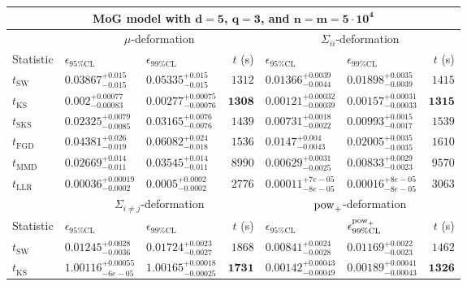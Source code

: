 \begin{tabular}{l|llr|llr}
	\toprule
	\multicolumn{7}{c}{{\bf MoG model with $\mathbf{d=5}$, $\mathbf{q=3}$, and $\mathbf{n=m=5\cdot 10^{4}}$}} \\
	\toprule
	\multicolumn{1}{c}{} & \multicolumn{3}{c}{$\mu$-deformation} & \multicolumn{3}{c}{$\Sigma_{ii}$-deformation} \\
	Statistic & $\epsilon_{95\%\mathrm{CL}}$ & $\epsilon_{99\%\mathrm    {CL}}$ & $t$ (s) & $\epsilon_{95\%\mathrm{CL}}$ & $\epsilon_{99\%\mathrm{CL}}$ & $t$ (s) \\
	\midrule
	$t_{\mathrm{SW}}$ & $0.03867_{-0.015}^{+0.015}$ & $0.05335_{-0.015}^{+0.015}$ & $1312$ & $0.01366_{-0.0044}^{+0.0039}$ & $0.01898_{-0.0039}^{+0.0035}$ & $1415$ \\
	$t_{\overline{\mathrm{KS}}}$ & ${\mathbf{0.002_{-0.00083}^{+0.00077}}}$ & ${\mathbf{0.00277_{-0.00076}^{+0.00075}}}$ & ${\mathbf{1308}}$ & ${\mathbf{0.00121_{-0.00039}^{+0.00032}}}$ & ${\mathbf{0.00157_{-0.00033}^{+0.00031}}}$ & ${\mathbf{1315}}$ \\
	$t_{\mathrm{SKS}}$ & $0.02325_{-0.0085}^{+0.0079}$ & $0.03165_{-0.0076}^{+0.0076}$ & $1439$ & $0.00731_{-0.0022}^{+0.0018}$ & $0.00993_{-0.0017}^{+0.0015}$ & $1539$ \\
	$t_{\mathrm{FGD}}$ & $0.04381_{-0.019}^{+0.026}$ & $0.06082_{-0.018}^{+0.024}$ & $1536$ & $0.0147_{-0.0043}^{+0.004}$ & $0.02005_{-0.0035}^{+0.0035}$ & $1610$ \\
	$t_{\mathrm{MMD}}$ & $0.02669_{-0.011}^{+0.014}$ & $0.03545_{-0.011}^{+0.014}$ & $8990$ & $0.00629_{-0.0025}^{+0.0031}$ & $0.00833_{-0.0023}^{+0.0029}$ & $9570$ \\
	$t_{\mathrm{LLR}}$ & $0.00036_{-0.0002}^{+0.00019}$ & $0.0005_{-0.0002}^{+0.0002}$ & $2776$ & $0.00011_{-8e-05}^{+7e-05}$ & $0.00016_{-8e-05}^{+8e-05}$ & $3063$ \\
	\toprule
	\multicolumn{1}{c}{} & \multicolumn{3}{c}{$\Sigma_{i\neq j}$-deformation} & \multicolumn{3}{c}{$\rm{pow}_{+}$-deformation} \\
	Statistic & $\epsilon_{95\%\mathrm{CL}}$ & $\epsilon_{99\%\mathrm{CL}}$ & $t$ (s) & $\epsilon_{95\%\mathrm{CL}}$ & $\epsilon^{\rm   {pow}_{+}}_{99\%\mathrm{CL}}$ & $t$ (s) \\
	\midrule
	$t_{\mathrm{SW}}$ & $0.01245_{-0.0036}^{+0.0028}$ & $0.01724_{-0.0027}^{+0.0023}$ & $1868$ & $0.00841_{-0.0028}^{+0.0024}$ & $0.01169_{-0.0023}^{+0.0022}$ & $1462$ \\
	$t_{\overline{\mathrm{KS}}}$ & $1.00116_{-6e-05}^{+0.00055}$ & $1.00165_{-0.00025}^{+0.00018}$ & ${\mathbf{1731}}$ & ${\mathbf{0.00142_{-0.00049}^{+0.00043}}}$ & ${\mathbf{0.00189_{-0.00043}^{+0.00041}}}$ & ${\mathbf{1326}}$ \\

\end{tabular}
